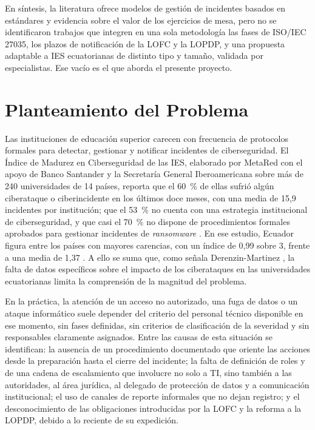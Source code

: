 En síntesis, la literatura ofrece modelos de gestión de incidentes basados en estándares y evidencia sobre el valor de los ejercicios de mesa, pero no se identificaron trabajos que integren en una sola metodología las fases de ISO/IEC 27035, los plazos de notificación de la LOFC y la LOPDP, y una propuesta adaptable a IES ecuatorianas de distinto tipo y tamaño, validada por especialistas. Ese vacío es el que aborda el presente proyecto.

\section{Planteamiento del Problema}
Las instituciones de educación superior carecen con frecuencia de protocolos formales para detectar, gestionar y notificar incidentes de ciberseguridad. El Índice de Madurez en Ciberseguridad de las IES, elaborado por MetaRed con el apoyo de Banco Santander y la Secretaría General Iberoamericana sobre más de 240 universidades de 14 países, reporta que el 60~\% de ellas sufrió algún ciberataque o ciberincidente en los últimos doce meses, con una media de 15,9 incidentes por institución; que el 53~\% no cuenta con una estrategia institucional de ciberseguridad, y que casi el 70~\% no dispone de procedimientos formales aprobados para gestionar incidentes de \textit{ransomware} \cite{metared2025imc}. En ese estudio, Ecuador figura entre los países con mayores carencias, con un índice de 0,99 sobre 3, frente a una media de 1,37 \cite{metared2025imc}. A ello se suma que, como señala Derenzin-Martinez \cite{derenzin2024}, la falta de datos específicos sobre el impacto de los ciberataques en las universidades ecuatorianas limita la comprensión de la magnitud del problema.

En la práctica, la atención de un acceso no autorizado, una fuga de datos o un ataque informático suele depender del criterio del personal técnico disponible en ese momento, sin fases definidas, sin criterios de clasificación de la severidad y sin responsables claramente asignados. Entre las causas de esta situación se identifican: la ausencia de un procedimiento documentado que oriente las acciones desde la preparación hasta el cierre del incidente; la falta de definición de roles y de una cadena de escalamiento que involucre no solo a TI, sino también a las autoridades, al área jurídica, al delegado de protección de datos y a comunicación institucional; el uso de canales de reporte informales que no dejan registro; y el desconocimiento de las obligaciones introducidas por la LOFC y la reforma a la LOPDP, debido a lo reciente de su expedición.

